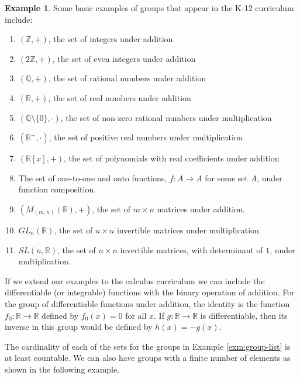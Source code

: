 \documentclass[
]{book}
\theoremstyle{definition}
\theoremstyle{definition}
\newtheorem{example}{Example}[chapter]
\theoremstyle{definition}
\theoremstyle{remark}
\begin{document}
\begin{example}
\protect\hypertarget{exm:group-list}{}{\label{exm:group-list} }Some basic examples of groups that appear in the K-12 curriculum include:

\begin{enumerate}
\def\labelenumi{\arabic{enumi}.}
\item
  \((\mathbb{Z},+)\), the set of integers under addition
\item
  \((2\mathbb{Z},+)\), the set of even integers under addition
\item
  \((\mathbb{Q},+)\), the set of rational numbers under addition
\item
  \((\mathbb{R},+)\), the set of real numbers under addition
\item
  \((\mathbb{Q}\setminus\{0\} , \cdot)\), the set of non-zero rational numbers under multiplication
\item
  \(( \mathbb{R}^+, \cdot)\), the set of positive real numbers under multiplication
\item
  \(\left( \mathbb{R}[x], +\right)\), the set of polynomials with real coefficients under addition
\item
  The set of one-to-one and onto functions, \(f:A\rightarrow A\) for some set \(A\), under function composition.
\item
  \(\left( M_{(m,n)}(\mathbb{R}), + \right)\), the set of \(m \times n\) matrices under addition.
\item
  \(GL_n(\mathbb{R})\), the set of \(n \times n\) invertible matrices under multiplication.
\item
  \(SL(n,\mathbb{R})\), the set of \(n \times n\) invertible matrices, with determinant of \(1\), under multiplication.
\end{enumerate}
\end{example}

If we extend our examples to the calculus curriculum we can include the differentiable (or integrable) functions with the binary operation of addition. For the group of differentiable functions under addition, the identity is the function \(f_0:\mathbb{R}\rightarrow \mathbb{R}\) defined by \(f_0(x)=0\) for all \(x\). If \(g:\mathbb{R}\rightarrow \mathbb{R}\) is differentiable, then its inverse in this group would be defined by \(h(x)=-g(x)\).

The cardinality of each of the sets for the groups in Example \ref{exm:group-list} is at least countable. We can also have groups with a finite number of elements as shown in the following example.
\end{document}
